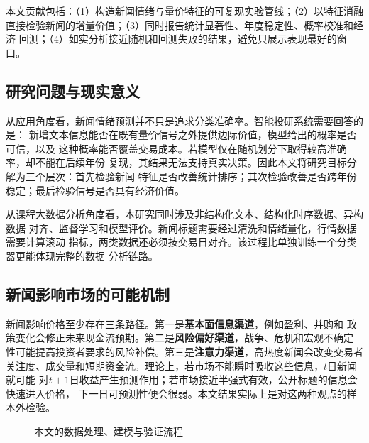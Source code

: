 \documentclass[UTF8,a4paper,10pt,twocolumn,fontset=none]{ctexart}
\begin{document}
本文贡献包括：（1）构造新闻情绪与量价特征的可复现实验管线；（2）以特征消融
直接检验新闻的增量价值；（3）同时报告统计显著性、年度稳定性、概率校准和经济
回测；（4）如实分析接近随机和回测失败的结果，避免只展示表现最好的窗口。

\subsection{研究问题与现实意义}

从应用角度看，新闻情绪预测并不只是追求分类准确率。智能投研系统需要回答的是：
新增文本信息能否在既有量价信号之外提供边际价值，模型给出的概率是否可信，以及
这种概率能否覆盖交易成本。若模型仅在随机划分下取得较高准确率，却不能在后续年份
复现，其结果无法支持真实决策。因此本文将研究目标分解为三个层次：首先检验新闻
特征是否改善统计排序；其次检验改善是否跨年份稳定；最后检验信号是否具有经济价值。

从课程大数据分析角度看，本研究同时涉及非结构化文本、结构化时序数据、异构数据
对齐、监督学习和模型评价。新闻标题需要经过清洗和情绪量化，行情数据需要计算滚动
指标，两类数据还必须按交易日对齐。该过程比单独训练一个分类器更能体现完整的数据
分析链路。

\subsection{新闻影响市场的可能机制}

新闻影响价格至少存在三条路径。第一是\textbf{基本面信息渠道}，例如盈利、并购和
政策变化会修正未来现金流预期。第二是\textbf{风险偏好渠道}，战争、危机和宏观不确定
性可能提高投资者要求的风险补偿。第三是\textbf{注意力渠道}，高热度新闻会改变交易者
关注度、成交量和短期资金流。理论上，若市场不能瞬时吸收这些信息，$t$日新闻就可能
对$t+1$日收益产生预测作用；若市场接近半强式有效，公开标题的信息会快速进入价格，
下一日可预测性便会很弱。本文结果实际上是对这两种观点的样本外检验。

\begin{figure}[!htbp]
\centering
{}
\caption{本文的数据处理、建模与验证流程}
\label{fig:workflow}
\end{figure}
\end{document}
